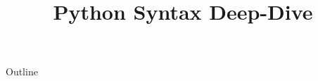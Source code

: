 \documentclass[xcolor=dvipsnames,compress,t,pdf]{beamer}
\title[\insertframenumber /\inserttotalframenumber]{Python Syntax Deep-Dive}
\begin{document}
	\begin{frame}
	\titlepage
	\end{frame}

	\begin{frame}{Outline}
	    \tableofcontents
	\end{frame}

	
	
	
\end{document}
